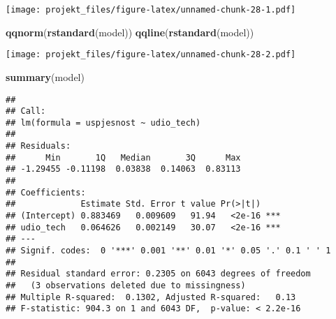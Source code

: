 \documentclass[
]{article}
\newenvironment{Shaded}{\begin{snugshade}}{\end{snugshade}}
\newcommand{\DataTypeTok}[1]{\textcolor[rgb]{0.13,0.29,0.53}{#1}}
\newcommand{\DecValTok}[1]{\textcolor[rgb]{0.00,0.00,0.81}{#1}}
\newcommand{\KeywordTok}[1]{\textcolor[rgb]{0.13,0.29,0.53}{\textbf{#1}}}
\newcommand{\NormalTok}[1]{#1}
\newcommand{\OperatorTok}[1]{\textcolor[rgb]{0.81,0.36,0.00}{\textbf{#1}}}
\newcommand{\StringTok}[1]{\textcolor[rgb]{0.31,0.60,0.02}{#1}}
\begin{document}
\begin{Shaded}
\end{Shaded}

\texttt{[image: projekt\_files/figure-latex/unnamed-chunk-28-1.pdf]}

\begin{Shaded}
\begin{Highlighting}[]
\KeywordTok{qqnorm}\NormalTok{(}\KeywordTok{rstandard}\NormalTok{(model))}
\KeywordTok{qqline}\NormalTok{(}\KeywordTok{rstandard}\NormalTok{(model))}
\end{Highlighting}
\end{Shaded}

\texttt{[image: projekt\_files/figure-latex/unnamed-chunk-28-2.pdf]}

\begin{Shaded}
\begin{Highlighting}[]
\KeywordTok{summary}\NormalTok{(model)}
\end{Highlighting}
\end{Shaded}

\begin{verbatim}
## 
## Call:
## lm(formula = uspjesnost ~ udio_tech)
## 
## Residuals:
##      Min       1Q   Median       3Q      Max 
## -1.29455 -0.11198  0.03838  0.14063  0.83113 
## 
## Coefficients:
##             Estimate Std. Error t value Pr(>|t|)    
## (Intercept) 0.883469   0.009609   91.94   <2e-16 ***
## udio_tech   0.064626   0.002149   30.07   <2e-16 ***
## ---
## Signif. codes:  0 '***' 0.001 '**' 0.01 '*' 0.05 '.' 0.1 ' ' 1
## 
## Residual standard error: 0.2305 on 6043 degrees of freedom
##   (3 observations deleted due to missingness)
## Multiple R-squared:  0.1302, Adjusted R-squared:   0.13 
## F-statistic: 904.3 on 1 and 6043 DF,  p-value: < 2.2e-16
\end{verbatim}
\end{document}
